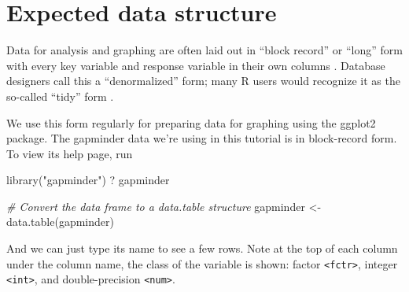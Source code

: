 \documentclass[
]{book}
\newenvironment{Shaded}{\begin{snugshade}}{\end{snugshade}}
\newcommand{\CommentTok}[1]{\textcolor[rgb]{0.56,0.35,0.01}{\textit{#1}}}
\newcommand{\FunctionTok}[1]{\textcolor[rgb]{0.00,0.00,0.00}{#1}}
\newcommand{\NormalTok}[1]{#1}
\newcommand{\OtherTok}[1]{\textcolor[rgb]{0.56,0.35,0.01}{#1}}
\newcommand{\StringTok}[1]{\textcolor[rgb]{0.31,0.60,0.02}{#1}}
\begin{document}
\hypertarget{expected-data-structure}{%
\section{Expected data structure}\label{expected-data-structure}}

Data for analysis and graphing are often laid out in ``block record'' or ``long'' form with every key variable and response variable in their own columns \citep{Mount+Zumel:2019:fluid-data}. Database designers call this a ``denormalized'' form; many R users would recognize it as the so-called ``tidy'' form \citep{Wickham+Grolemund:2017}.

We use this form regularly for preparing data for graphing using the ggplot2 package. The gapminder data we're using in this tutorial is in block-record form. To view its help page, run

\begin{Shaded}
\begin{Highlighting}[]
\FunctionTok{library}\NormalTok{(}\StringTok{"gapminder"}\NormalTok{)}
\NormalTok{? gapminder}
\end{Highlighting}
\end{Shaded}

\begin{Shaded}
\begin{Highlighting}[]
\CommentTok{\# Convert the data frame to a data.table structure }
\NormalTok{gapminder }\OtherTok{\textless{}{-}} \FunctionTok{data.table}\NormalTok{(gapminder)}
\end{Highlighting}
\end{Shaded}

And we can just type its name to see a few rows. Note at the top of each column under the column name, the class of the variable is shown: factor \texttt{\textless{}fctr\textgreater{}}, integer \texttt{\textless{}int\textgreater{}}, and double-precision \texttt{\textless{}num\textgreater{}}.
\end{document}
